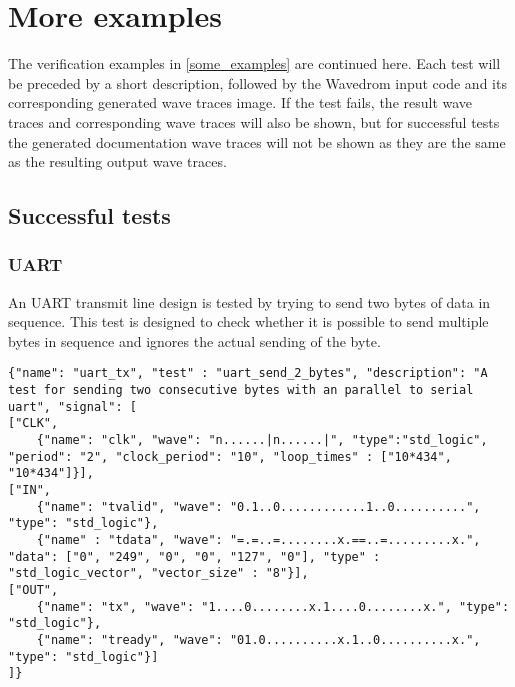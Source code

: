 \pagestyle{mylandscape}
\chapter{More examples}\label{appendix:more_examples}
The verification examples in \ref{some_examples} are continued here. Each test will be preceded by a short description, followed by the Wavedrom input code and its corresponding generated wave traces image. If the test fails, the result wave traces and corresponding wave traces will also be shown, but for successful tests the generated documentation wave traces will not be shown as they are the same as the resulting output wave traces.\newpage
{}
\section{Successful tests}
\subsection{UART}\label{appendix:more_examples:uart}
An UART transmit line design is tested by trying to send two bytes of data in sequence. This test is designed to check whether it is possible to send multiple bytes in sequence and ignores the actual sending of the byte.
\npar
\begin{lstlisting}[style=json, caption={Functionality test for the UART design in appendix \ref{appendix:uart}}, label={json:uart}]
{"name": "uart_tx", "test" : "uart_send_2_bytes", "description": "A test for sending two consecutive bytes with an parallel to serial uart", "signal": [
["CLK",
	{"name": "clk", "wave": "n......|n......|", "type":"std_logic", "period": "2", "clock_period": "10", "loop_times" : ["10*434", "10*434"]}],
["IN",
	{"name": "tvalid", "wave": "0.1..0............1..0..........", "type": "std_logic"},
	{"name" : "tdata", "wave": "=.=..=........x.==..=.........x.", "data": ["0", "249", "0", "0", "127", "0"], "type" : "std_logic_vector", "vector_size" : "8"}],
["OUT",
	{"name": "tx", "wave": "1....0........x.1....0........x.", "type": "std_logic"},
	{"name": "tready", "wave": "01.0..........x.1..0..........x.", "type": "std_logic"}]
]}
\end{lstlisting}
\clearpage
